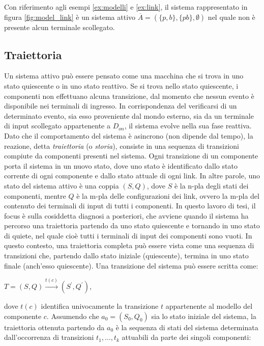 \begin{ex} \label{ex:sa}
Con riferimento agli esempi \ref{ex:modelli} e \ref{ex:link}, il sistema rappresentato in figura \ref{fig:model_link} è un sistema attivo $\overline A = (\{p,b\},\{pb\},\emptyset)$ nel quale non è presente alcun terminale scollegato.
\end{ex}

\subsection{Traiettoria}
Un sistema attivo può essere pensato come una macchina che si trova in uno stato quiescente o in uno stato reattivo. Se si trova nello stato quiescente, i componenti non effettuano alcuna transizione, dal momento che nessun evento è disponibile nei terminali di ingresso. In corrispondenza del verificarsi di un determinato evento, sia esso proveniente dal mondo esterno, sia da un terminale di input scollegato appartenente a $D_{on}$, il sistema evolve nella sua fase reattiva. Dato che il comportamento del sistema è asincrono (non dipende dal tempo), la reazione, detta \emph{traiettoria} (o \emph{storia}), consiste in una sequenza di transizioni compiute da componenti presenti nel sistema.
Ogni transizione di un componente porta il sistema in un nuovo stato, dove uno stato è identificato dallo stato corrente di ogni componente e dallo stato attuale di ogni link. In altre parole, uno stato del sistema attivo è una coppia $(S,Q)$, dove $S$ è la n-pla degli stati dei componenti, mentre $Q$ è la m-pla delle configurazioni dei link, ovvero la m-pla del contenuto dei terminali di input di tutti i componenti.
In questo lavoro di tesi, il focus è sulla cosiddetta diagnosi a posteriori, che avviene quando il sistema ha percorso una traiettoria partendo da uno stato quiescente e tornando in uno stato di quiete, nel quale cioè tutti i terminali di input dei componenti sono vuoti. In questo contesto, una traiettoria completa può essere vista come una sequenza di transizioni che, partendo dallo stato iniziale (quiescente), termina in uno stato finale (anch'esso quiescente).
Una transizione del sistema può essere scritta come:
\begin{center}
	$T = (S,Q) \xrightarrow {t(c)} (S^\prime,Q^\prime)$,
\end{center}
dove $t(c)$ identifica univocamente la transizione $t$ appartenente al modello del componente $c$.
Assumendo che $a_0 = (S_0,Q_0)$ sia lo stato iniziale del sistema, la traiettoria ottenuta partendo da $a_0$ è la sequenza di stati del sistema determinata dall'occorrenza di transizioni $t_1, \ldots , t_k$ attuabili da parte dei singoli componenti:

